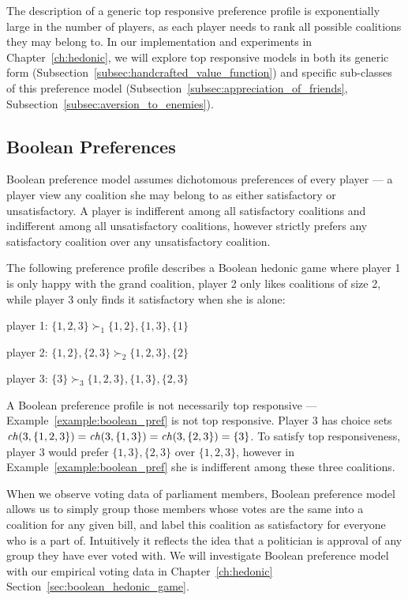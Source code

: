 The description of a generic top responsive preference profile is exponentially
large in the number of players, as each player needs to rank all possible
coalitions they may belong to.
In our implementation and experiments in Chapter~\ref{ch:hedonic}, we will
explore top responsive models in both its generic form
(Subsection~\ref{subsec:handcrafted_value_function}) and specific sub-classes of
this preference model (Subsection~\ref{subsec:appreciation_of_friends},
Subsection~\ref{subsec:aversion_to_enemies}).

\subsection{Boolean Preferences}
\label{subsec:boolean_preferences}
Boolean preference model assumes dichotomous preferences of every player ---
a player view any coalition she may belong to as either satisfactory or
unsatisfactory.
A player is indifferent among all satisfactory coalitions and indifferent
among all unsatisfactory coalitions, however strictly prefers any satisfactory
coalition over any unsatisfactory coalition.

\begin{example}
\label{example:boolean_pref}
  The following preference profile describes a Boolean hedonic game where
  player 1 is only happy with the grand coalition, player 2 only likes coalitions
  of size 2, while player 3 only finds it satisfactory when she is alone:

  player 1: $\{1, 2, 3\} \succ_1 \{1, 2\}, \{1, 3\}, \{1\}$

  player 2: $\{1, 2\}, \{2, 3\} \succ_2 \{1, 2, 3\}, \{2\}$

  player 3: $\{3\} \succ_3 \{1, 2, 3\}, \{1, 3\}, \{2, 3\}$
\end{example}

A Boolean preference profile is not necessarily top responsive --- 
Example~\ref{example:boolean_pref} is not top responsive.
Player 3 has choice sets
$\mathit{ch}(3, \{1, 2, 3\}) = \mathit{ch}(3, \{1, 3\}) = \mathit{ch}(3, \{2, 3\}) = \{3\}$.
To satisfy top responsiveness, player 3 would prefer $\{1, 3\}, \{2, 3\}$ over
$\{1, 2, 3\}$, however in Example~\ref{example:boolean_pref} she is indifferent
among these three coalitions.

When we observe voting data of parliament members, Boolean preference model
allows us to simply group those members whose votes are the same into a coalition
for any given bill, and label this coalition as satisfactory for everyone who is
a part of.
Intuitively it reflects the idea that a politician is approval of any group they
have ever voted with.
We will investigate Boolean preference model with our empirical voting data in
Chapter~\ref{ch:hedonic} Section~\ref{sec:boolean_hedonic_game}.


